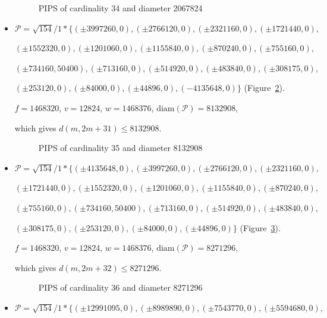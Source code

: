 \documentclass[12pt]{article}
\theoremstyle{theorem}
\theoremstyle{dfn}
\theoremstyle{remark}
\begin{document}
\begin{itemize}
\begin{figure}[h!]
\parbox{1\linewidth}{\caption{PIPS of cardinality 34 and diameter 2067824}
\label{picture_34.png}}
\end{figure}


\item
$\mathcal{P}=\sqrt{154}/{1} * \{ (\pm 3997260, 0),
(\pm 2766120, 0),
(\pm 2321160, 0),
(\pm 1721440, 0),
$

$
(\pm 1552320, 0),
(\pm 1201060, 0),
(\pm 1155840, 0),
(\pm 870240, 0),
(\pm 755160, 0),
$

$
(\pm 734160, 50400),
(\pm 713160, 0),
(\pm 514920, 0),
(\pm 483840, 0),
(\pm 308175, 0),
$

$
(\pm 253120, 0),
(\pm 84000, 0),
(\pm 44896, 0),
(-4135648 , 0)\}
$
(Figure~\ref{picture_35.png}).

$f = 1468320$, $v = 12824$, $w = 1468376$, $\operatorname{diam(\mathcal{P})} = 8132908$,

which gives $d(m, 2m + 31) \leq 8132908$.


\begin{figure}[h!]
\parbox{1\linewidth}{\caption{PIPS of cardinality 35 and diameter 8132908}
\label{picture_35.png}}
\end{figure}


\item
$\mathcal{P}=\sqrt{154}/{1} * \{ (\pm 4135648, 0),
(\pm 3997260, 0),
(\pm 2766120, 0),
(\pm 2321160, 0),
$

$
(\pm 1721440, 0),
(\pm 1552320, 0),
(\pm 1201060, 0),
(\pm 1155840, 0),
(\pm 870240, 0),
$

$
(\pm 755160, 0),
(\pm 734160, 50400),
(\pm 713160, 0),
(\pm 514920, 0),
(\pm 483840, 0),
$

$
(\pm 308175, 0),
(\pm 253120, 0),
(\pm 84000, 0),
(\pm 44896, 0)\}
$
(Figure~\ref{picture_36.png}).

$f = 1468320$, $v = 12824$, $w = 1468376$, $\operatorname{diam(\mathcal{P})} = 8271296$,

which gives $d(m, 2m + 32) \leq 8271296$.


\begin{figure}[h!]
\parbox{1\linewidth}{\caption{PIPS of cardinality 36 and diameter 8271296}
\label{picture_36.png}}
\end{figure}


\item
$\mathcal{P}=\sqrt{154}/{1} * \{ (\pm 12991095, 0),
(\pm 8989890, 0),
(\pm 7543770, 0),
(\pm 5594680, 0),
$


\end{itemize}
\end{document}
